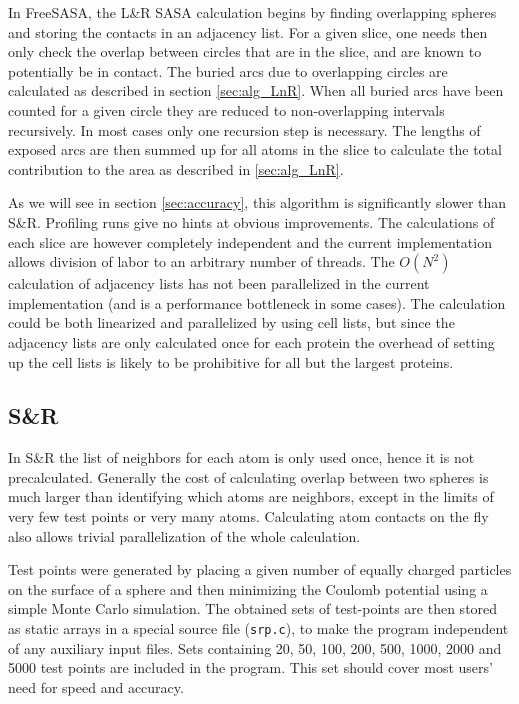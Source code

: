 \documentclass[a4paper,11pt]{article}
\begin{document}
\begin{small}
In FreeSASA, the L\&R SASA calculation begins by finding overlapping
spheres and storing the contacts in an adjacency list. For a given
slice, one needs then only check the overlap between circles that are
in the slice, and are known to potentially be in contact. The buried
arcs due to overlapping circles are calculated as described in section
\ref{sec:alg_LnR}. When all buried arcs have been counted for a given
circle they are reduced to non-overlapping intervals recursively. In
most cases only one recursion step is necessary. The lengths of
exposed arcs are then summed up for all atoms in the slice to
calculate the total contribution to the area as described in
\ref{sec:alg_LnR}.

As we will see in section \ref{sec:accuracy}, this algorithm is
significantly slower than S\&R. Profiling runs give no hints at
obvious improvements. The calculations of each slice are however
completely independent and the current implementation allows division
of labor to an arbitrary number of threads. The $O(N^2)$ calculation
of adjacency lists has not been parallelized in the current
implementation (and is a performance bottleneck in some cases). The
calculation could be both linearized and parallelized by using cell
lists, but since the adjacency lists are only calculated once for each
protein the overhead of setting up the cell lists is likely to be
prohibitive for all but the largest proteins.

\subsection{S\&R}

In S\&R the list of neighbors for each atom is only used once, hence
it is not precalculated. Generally the cost of calculating overlap
between two spheres is much larger than identifying which atoms are
neighbors, except in the limits of very few test points or very many
atoms. Calculating atom contacts on the fly also allows trivial
parallelization of the whole calculation.

Test points were generated by placing a given number of equally
charged particles on the surface of a sphere and then minimizing the
Coulomb potential using a simple Monte Carlo simulation. The obtained
sets of test-points are then stored as static arrays in a special
source file (\texttt{srp.c}), to make the program independent of any
auxiliary input files. Sets containing 20, 50, 100, 200, 500, 1000,
2000 and 5000 test points are included in the program. This set should
cover most users' need for speed and accuracy.


\end{small}
\end{document}
